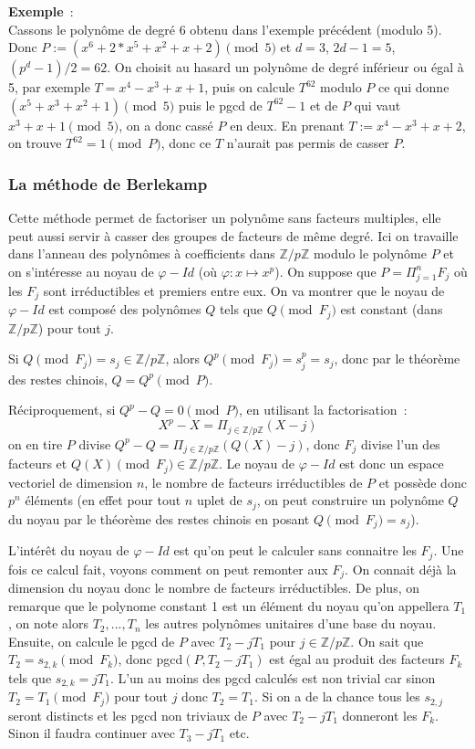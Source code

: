 \documentclass[a4paper,11pt]{article}
\newcommand{\Z}{{\mathbb{Z}}}
\begin{document}
\begin{giacjshere}
{\bf Exemple}~:\\ 
Cassons le polynôme de degré 6 obtenu dans l'exemple précédent
(modulo 5). Donc $P:=(x^6+2*x^5+x^2+x+2) \pmod 5$ et $d=3$, $2d-1=5$,
$(p^{d}-1)/2=62$.
On choisit au hasard un polynôme de degré inférieur ou égal à 5, par exemple
$T=x^4-x^3+x+1$, puis on calcule $T^{62}$ modulo $P$ ce qui donne
$(x^5+x^3+x^2+1) \pmod 5$ puis le pgcd de $T^{62}-1$ et de $P$
qui vaut $x^3+x+1 \pmod 5$, on a donc cassé $P$ en deux. 
En prenant $T:=x^4-x^3+x+2$, on trouve $T^{62}=1 \pmod P$, donc
ce $T$ n'aurait pas permis de casser $P$.

\subsubsection{La méthode de Berlekamp}
Cette méthode permet de factoriser un polynôme sans facteurs multiples,
elle peut aussi servir à casser des groupes de facteurs de même degré.
Ici on travaille dans l'anneau des polynômes à coefficients dans $\Z/p\Z$
modulo le polynôme $P$ et on s'intéresse au noyau de $\varphi-Id$
(où $\varphi: x \mapsto x^p$). On
suppose que $P=\Pi_{j=1}^n F_j$ où les $F_j$ sont irréductibles et
premiers entre eux. On va montrer que le noyau de $\varphi-Id$ est
composé des polynômes $Q$ tels que $Q \pmod {F_j}$ est constant
(dans $\Z/p\Z$) pour tout $j$.

Si $Q \pmod {F_j}=s_j \in \Z/p\Z$, alors $Q^p \pmod {F_j}=s_j^p=s_j$, donc
par le théorème des restes chinois, $Q=Q^p \pmod P$. 

Réciproquement, si
$Q^p-Q=0 \pmod P$, en utilisant la factorisation~:
\[ X^p-X= \Pi_{j \in \Z/p\Z } (X-j)\]
on en tire $P$ divise $Q^p-Q=\Pi_{j \in \Z/p\Z } (Q(X)-j)$,
donc $F_j$ divise l'un des facteurs et $Q(X) \pmod {F_j} \in \Z/p\Z$.
Le noyau de $\varphi -Id$
est donc un espace vectoriel de dimension $n$, le nombre
de facteurs irréductibles de $P$ et possède donc $p^n$ éléments
(en effet pour tout $n$ uplet de $s_j$, on peut construire un polynôme
$Q$ du noyau par le théorème des restes chinois en posant $Q\pmod {F_j}=s_j$).

L'intérêt du noyau de $\varphi-Id$ est qu'on peut le calculer sans connaitre
les $F_j$. Une fois ce calcul fait, voyons comment on peut remonter 
aux $F_j$. On connait déjà la dimension du noyau donc le nombre de facteurs
irréductibles. De plus, on remarque que le polynome constant 1 est un
élément du noyau qu'on appellera $T_1$, on note alors $T_2,...,T_n$ les
autres polynômes unitaires d'une base du noyau. 
Ensuite, on calcule le pgcd de $P$ avec $T_2-jT_1$
pour $j\in \Z/p\Z$. On sait que $T_2=s_{2,k} \pmod {F_k}$, donc pgcd$(P,T_2-jT_1)$
est égal au produit des facteurs $F_k$ tels que $s_{2,k}=jT_1$. L'un au moins
des pgcd calculés est non trivial car sinon $T_2=T_1 \pmod{F_j}$ pour
tout $j$ donc $T_2=T_1$. Si on a de la chance tous les $s_{2,j}$ seront
distincts et les pgcd non triviaux de $P$ avec $T_2-jT_1$ donneront les $F_k$.
Sinon il faudra continuer avec $T_3-jT_1$ etc.


\end{giacjshere}
\end{document}
